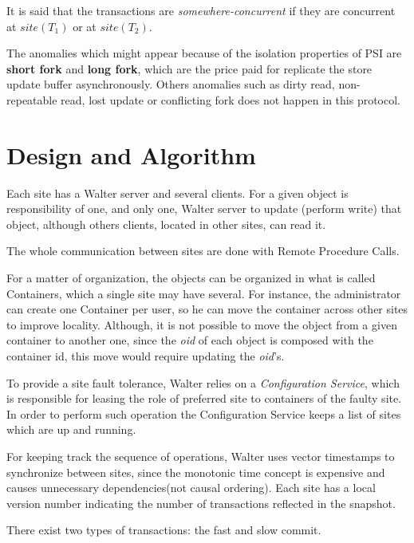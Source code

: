\documentclass[a4paper]{article}
\begin{document}
It is said that the transactions are \textit{somewhere-concurrent} if they are concurrent at $site(T_{1})$ or at $site(T_{2})$.

The anomalies which might appear because of the isolation properties of PSI are \textbf{short fork} and \textbf{long fork}, which are the price paid for replicate the store update buffer asynchronously. Others anomalies such as dirty read, non-repeatable read, lost update or conflicting fork does not happen in this protocol. 


\section{Design and Algorithm}

Each site has a Walter server and several clients. For a given object is responsibility of one, and only one, Walter server to update (perform write) that object, although others clients, located in other sites, can read it.

The whole communication between sites are done with Remote Procedure Calls. %

For a matter of organization, the objects can be organized in what is called Containers, which a single site may have several. For instance, the administrator can create one Container per user, so he can move the container across other sites to improve locality. Although, it is not possible to move the object from a given container to another one, since the \textit{oid} of each object is composed with the container id, this move would require updating the \textit{oid}'s. 

To provide a site fault tolerance, Walter relies on a \textit{Configuration Service}, which is responsible for leasing the role of preferred site to containers of the faulty site. In order to perform such operation the Configuration Service keeps a list of sites which are up and running. 

For keeping track the sequence of operations, Walter uses vector timestamps to synchronize between sites, since the monotonic time concept is expensive and causes unnecessary dependencies(not causal ordering). Each site has a local version number indicating the number of transactions reflected in the snapshot.

There exist two types of transactions: the fast and slow commit. 
\end{document}
